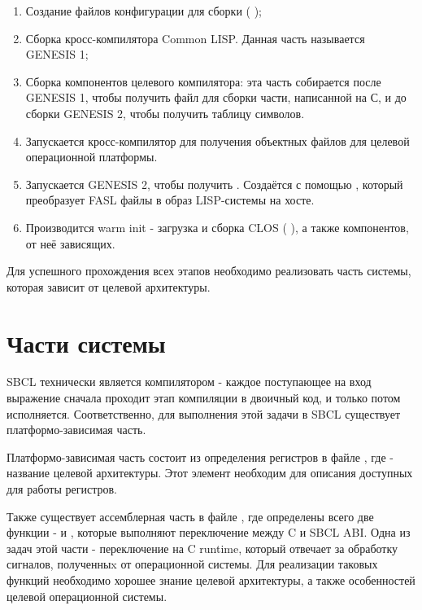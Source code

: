 \begin{enumerate}
\item Создание файлов конфигурации для сборки (  );
\item Сборка кросс-компилятора Common LISP. Данная часть называется
GENESIS 1;
\item Сборка компонентов целевого компилятора: эта часть собирается после
GENESIS 1, чтобы получить файл  для сборки части, написанной на
С, и до сборки GENESIS 2, чтобы получить таблицу символов.
\item Запускается кросс-компилятор для получения объектных файлов для
целевой операционной платформы.
\item Запускается GENESIS 2, чтобы получить .
Создаётся с помощью , который
преобразует FASL файлы в образ LISP-системы на хосте.
\item Производится warm init - загрузка и сборка CLOS
(  ), а также компонентов, от неё зависящих.
\end{enumerate}

Для успешного прохождения всех этапов необходимо реализовать часть
системы, которая зависит от целевой архитектуры.


\section{Части системы}

SBCL технически является компилятором - каждое поступающее на вход
выражение сначала проходит этап компиляции в двоичный код, и только потом
исполняется. Соответственно, для выполнения этой задачи в SBCL
существует платформо-зависимая часть.

Платформо-зависимая часть состоит из определения регистров в файле
 , где  -
название целевой архитектуры. Этот элемент необходим для описания
доступных для работы регистров.

Также существует ассемблерная часть в файле
, где определены всего две функции -
 и , которые выполняют переключение
между C и SBCL ABI. Одна из задач этой части - переключение на
C runtime, который отвечает за обработку сигналов, полученныx от
операционной системы. Для реализации таковых функций необходимо хорошее
знание  целевой архитектуры, а также особенностей
целевой операционной системы.

